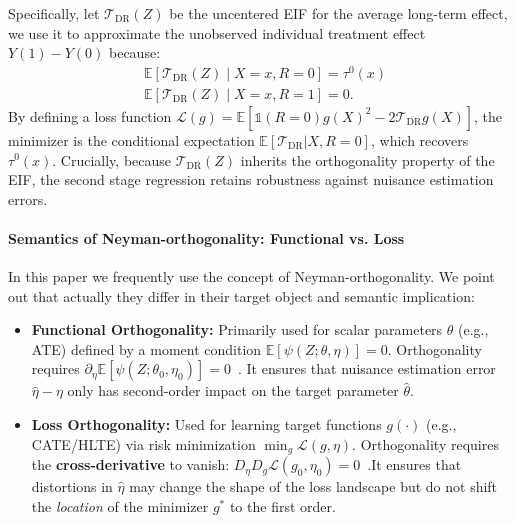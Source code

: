 \documentclass{article}
\theoremstyle{plain}
\theoremstyle{definition}
\theoremstyle{remark}
\newcommand{\1}{\mathds{1}}                %
\begin{document}
Specifically, let $\mathcal{T}_\mathrm{DR}(Z)$ be the uncentered EIF for the average long-term effect, we use it to approximate the unobserved individual treatment effect $Y(1)-Y(0)$ because:
\begin{align}
    &\mathbb{E}[\mathcal{T}_\mathrm{DR}(Z) \mid X=x, R=0] = \tau^0(x) \\
    &\mathbb{E}[\mathcal{T}_\mathrm{DR}(Z) \mid X=x, R=1] = 0.    
\end{align}
By defining a loss function $\mathcal{L}(g) = \mathbb{E}[\1(R=0)g(X)^2 - 2\mathcal{T}_\mathrm{DR}g(X)]$, the minimizer is the conditional expectation $\mathbb{E}[\mathcal{T}_\mathrm{DR}|X, R=0]$, which recovers $\tau^0(x)$. Crucially, because $\mathcal{T}_\mathrm{DR}(Z)$ inherits the orthogonality property of the EIF, the second stage regression retains robustness against nuisance estimation errors. 

\paragraph{Semantics of Neyman-orthogonality: Functional vs. Loss} In this paper we frequently use the concept of Neyman-orthogonality. We point out that actually they differ in their target object and semantic implication:

\begin{itemize}
    \item \textbf{Functional Orthogonality:} 
    Primarily used for scalar parameters $\theta$ (e.g., ATE) defined by a moment condition $\mathbb{E}[\psi(Z; \theta, \eta)] = 0$. Orthogonality requires $\partial_\eta \mathbb{E}[\psi(Z; \theta_0, \eta_0)] = 0$~\cite{Chernozhukov.2018}. It ensures that nuisance estimation error $\hat{\eta} - \eta$ only has second-order impact on the target parameter $\hat\theta$.

    \item \textbf{Loss Orthogonality:} 
    Used for learning target functions $g(\cdot)$ (e.g., CATE/HLTE) via risk minimization $\min_g \mathcal{L}(g, \eta)$. Orthogonality requires the \textbf{cross-derivative} to vanish: $D_\eta D_g \mathcal{L}(g_0, \eta_0) = 0$~\cite{Foster.2023}.It ensures that distortions in $\hat{\eta}$ may change the shape of the loss landscape but do not shift the \emph{location} of the minimizer $g^*$ to the first order.

\end{itemize}
\end{document}
